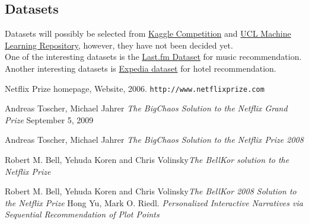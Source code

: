 \documentclass[11pt]{article} %
\begin{document}

 
\subsection{Datasets}
Datasets will possibly be selected from \href{https://www.kaggle.com/}{Kaggle Competition} and \href{http://archive.ics.uci.edu/ml/index.php}{UCL Machine Learning Repository}, however, they have not been decided yet.\\
One of the interesting datasets is the \href{http://www.dtic.upf.edu/~ocelma/MusicRecommendationDataset/index.html}{Last.fm Dataset} for music recommendation. 
Another interesting datasets is \href{https://www.kaggle.com/c/expedia-hotel-recommendations}{Expedia dataset} for hotel recommendation.


\begin{thebibliography}{9}
Netflix Prize homepage, Website, 2006.
\texttt{http://www.netflixprize.com}
 
Andreas Toscher, Michael Jahrer 
\textit{The BigChaos Solution to the Netflix Grand Prize} 
September 5, 2009

Andreas Toscher, Michael Jahrer 
\textit{The BigChaos Solution to the Netflix Prize 2008} 

Robert M. Bell, Yehuda Koren and Chris Volinsky\textit{The BellKor solution to the Netflix Prize}

Robert M. Bell, Yehuda Koren and Chris Volinsky\textit{The BellKor 2008 Solution to the Netflix Prize}
Hong Yu, Mark O. Riedl.
\textit{Personalized Interactive Narratives via Sequential
Recommendation of Plot Points}
\end{thebibliography}
\end{document}
